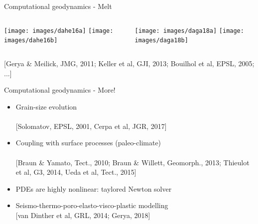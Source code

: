 \documentclass[handout]{beamer}
\begin{document}
\begin{frame}[plain]{Computational geodynamics - Melt}

\begin{columns}[onlytextwidth]
\texttt{[image: images/dahe16a]}
\texttt{[image: images/dahe16b]}

\texttt{[image: images/daga18a]}
\texttt{[image: images/daga18b]}
\end{columns}

\vspace{3mm}

{\tiny [Gerya \& Meilick, JMG, 2011; Keller et al, GJI, 2013; Bouilhol et al, EPSL, 2005; ...]}
\end{frame}

\begin{frame}[plain]{Computational geodynamics - More!}

\begin{itemize}

\item 
Grain-size evolution\\
\\
{\tiny [Solomatov, EPSL, 2001, Cerpa et al, JGR, 2017]}

\item 
Coupling with surface processes (paleo-climate)\\
\\
{\tiny [Braun \& Yamato, Tect., 2010; Braun \& Willett, Geomorph., 2013; Thieulot et al, G3, 2014, Ueda et al, Tect., 2015]}

\item 
PDEs are highly nonlinear: taylored Newton solver 

\item 
Seismo-thermo-poro-elasto-visco-plastic modelling\\
{\tiny [van Dinther et al, GRL, 2014; Gerya, 2018]} 

\end{itemize}

\end{frame}
\end{document}
